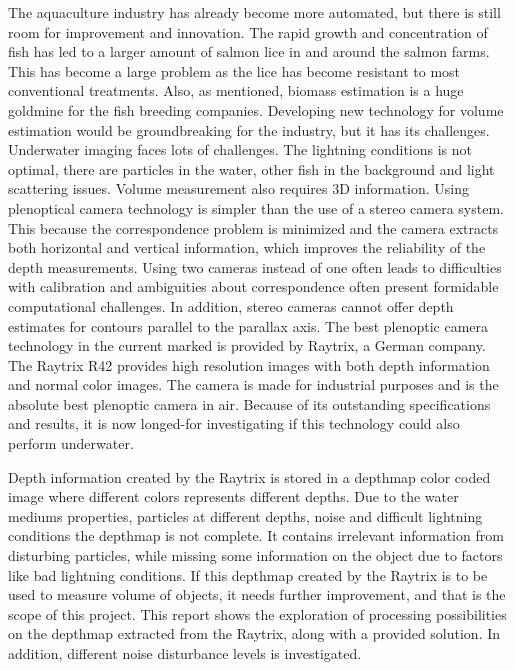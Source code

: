 The aquaculture industry has already become more automated, but there is still room for improvement and innovation. The rapid growth and concentration of fish has led to a larger amount of salmon lice in and around the salmon farms. This has become a large problem as the lice has become resistant to most conventional treatments. Also, as mentioned, biomass estimation is a huge goldmine for the fish breeding companies. Developing new technology for volume estimation would be groundbreaking for the industry, but it has its challenges.
Underwater imaging faces lots of challenges. The lightning conditions is not optimal, there are particles in the water, other fish in the background and light scattering issues. Volume measurement also requires 3D information. 
Using plenoptical camera technology is simpler than the use of a stereo camera system. This because the correspondence problem is minimized and the camera extracts both horizontal and vertical information, which improves the reliability of the depth measurements. Using two cameras instead of one often leads to difficulties with calibration and ambiguities about correspondence often present formidable computational challenges. In addition, stereo cameras cannot offer depth estimates for contours parallel to the parallax axis.\cite{article:stereo_vs_plenoptic}
The best plenoptic camera technology in the current marked is provided by Raytrix, a German company.\cite{article:plenoptic_camera} The Raytrix R42 provides high resolution images with both depth information and normal color images. The camera is made for industrial purposes and is the absolute best plenoptic camera in air. Because of its outstanding specifications and results, it is now longed-for investigating if this technology could also perform underwater. 

Depth information created by the Raytrix is stored in a depthmap color coded image where different colors represents different depths. Due to the water mediums properties, particles at different depths, noise and difficult lightning conditions the depthmap is not complete. It contains irrelevant information from disturbing particles, while missing some information on the object due to factors like bad lightning conditions. 
If this depthmap created by the Raytrix is to be used to measure volume of objects, it needs further improvement, and that is the scope of this project. 
This report shows the exploration of processing possibilities on the depthmap extracted from the Raytrix, along with a provided solution. In addition, different noise disturbance levels is investigated.


